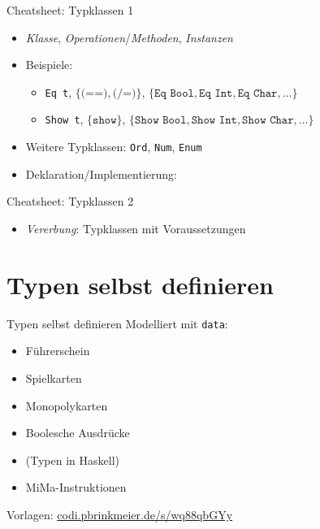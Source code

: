 \documentclass{beamer}
\begin{document}
\begin{frame}{Cheatsheet: Typklassen 1}
  \begin{itemize}
    \item \emph{Klasse}, \emph{Operationen}/\emph{Methoden}, \emph{Instanzen}
    \item Beispiele:
    \begin{itemize}
      \item \texttt{Eq t}, $\{ \texttt{(==)}, \texttt{(/=)} \}$, $\{ \texttt{Eq Bool}, \texttt{Eq Int}, \texttt{Eq Char}, ... \}$
      \item \texttt{Show t}, $\{ \texttt{show} \}$, $\{ \texttt{Show Bool}, \texttt{Show Int}, \texttt{Show Char}, ... \}$
    \end{itemize}
    \item Weitere Typklassen: \texttt{Ord}, \texttt{Num}, \texttt{Enum}
    \item Deklaration/Implementierung:
  \end{itemize}

\end{frame}

\begin{frame}{Cheatsheet: Typklassen 2}
  \begin{itemize}
    \item \emph{Vererbung}: Typklassen mit Voraussetzungen
  \end{itemize}

\end{frame}

\section{Typen selbst definieren}

\begin{frame}{Typen selbst definieren}
  Modelliert mit \texttt{data}:

  \vfill

  \begin{itemize}
    \item Führerschein
    \item Spielkarten
    \item Monopolykarten
    \item Boolesche Ausdrücke
    \item (Typen in Haskell)
    \item MiMa-Instruktionen
  \end{itemize}

  \vfill

  Vorlagen: \href{https://codi.pbrinkmeier.de/s/wq88qbGYy}{codi.pbrinkmeier.de/s/wq88qbGYy}
\end{frame}
\end{document}
